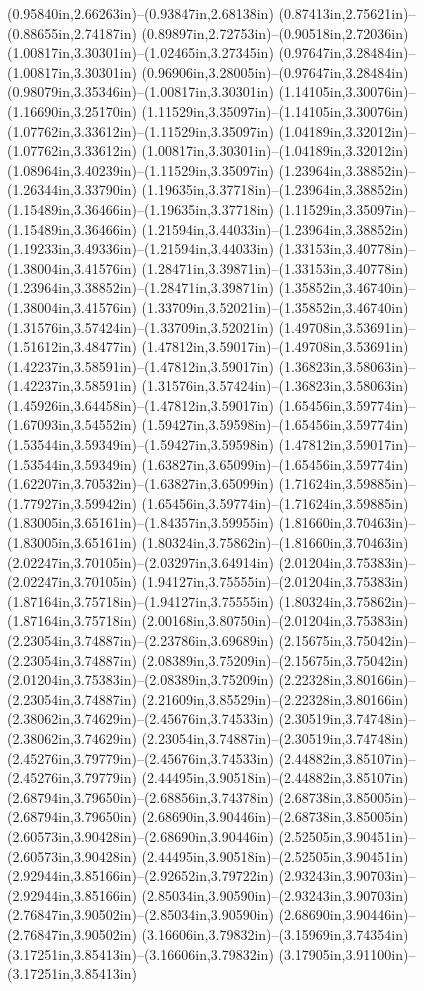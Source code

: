 (0.95840in,2.66263in)--(0.93847in,2.68138in) (0.87413in,2.75621in)--(0.88655in,2.74187in) (0.89897in,2.72753in)--(0.90518in,2.72036in) (1.00817in,3.30301in)--(1.02465in,3.27345in) (0.97647in,3.28484in)--(1.00817in,3.30301in) (0.96906in,3.28005in)--(0.97647in,3.28484in) (0.98079in,3.35346in)--(1.00817in,3.30301in) (1.14105in,3.30076in)--(1.16690in,3.25170in) (1.11529in,3.35097in)--(1.14105in,3.30076in) (1.07762in,3.33612in)--(1.11529in,3.35097in) (1.04189in,3.32012in)--(1.07762in,3.33612in) (1.00817in,3.30301in)--(1.04189in,3.32012in) (1.08964in,3.40239in)--(1.11529in,3.35097in) (1.23964in,3.38852in)--(1.26344in,3.33790in) (1.19635in,3.37718in)--(1.23964in,3.38852in) (1.15489in,3.36466in)--(1.19635in,3.37718in) (1.11529in,3.35097in)--(1.15489in,3.36466in) (1.21594in,3.44033in)--(1.23964in,3.38852in) (1.19233in,3.49336in)--(1.21594in,3.44033in) (1.33153in,3.40778in)--(1.38004in,3.41576in) (1.28471in,3.39871in)--(1.33153in,3.40778in) (1.23964in,3.38852in)--(1.28471in,3.39871in) (1.35852in,3.46740in)--(1.38004in,3.41576in) (1.33709in,3.52021in)--(1.35852in,3.46740in) (1.31576in,3.57424in)--(1.33709in,3.52021in) (1.49708in,3.53691in)--(1.51612in,3.48477in) (1.47812in,3.59017in)--(1.49708in,3.53691in) (1.42237in,3.58591in)--(1.47812in,3.59017in) (1.36823in,3.58063in)--(1.42237in,3.58591in) (1.31576in,3.57424in)--(1.36823in,3.58063in) (1.45926in,3.64458in)--(1.47812in,3.59017in) (1.65456in,3.59774in)--(1.67093in,3.54552in) (1.59427in,3.59598in)--(1.65456in,3.59774in) (1.53544in,3.59349in)--(1.59427in,3.59598in) (1.47812in,3.59017in)--(1.53544in,3.59349in) (1.63827in,3.65099in)--(1.65456in,3.59774in) (1.62207in,3.70532in)--(1.63827in,3.65099in) (1.71624in,3.59885in)--(1.77927in,3.59942in) (1.65456in,3.59774in)--(1.71624in,3.59885in) (1.83005in,3.65161in)--(1.84357in,3.59955in) (1.81660in,3.70463in)--(1.83005in,3.65161in) (1.80324in,3.75862in)--(1.81660in,3.70463in) (2.02247in,3.70105in)--(2.03297in,3.64914in) (2.01204in,3.75383in)--(2.02247in,3.70105in) (1.94127in,3.75555in)--(2.01204in,3.75383in) (1.87164in,3.75718in)--(1.94127in,3.75555in) (1.80324in,3.75862in)--(1.87164in,3.75718in) (2.00168in,3.80750in)--(2.01204in,3.75383in) (2.23054in,3.74887in)--(2.23786in,3.69689in) (2.15675in,3.75042in)--(2.23054in,3.74887in) (2.08389in,3.75209in)--(2.15675in,3.75042in) (2.01204in,3.75383in)--(2.08389in,3.75209in) (2.22328in,3.80166in)--(2.23054in,3.74887in) (2.21609in,3.85529in)--(2.22328in,3.80166in) (2.38062in,3.74629in)--(2.45676in,3.74533in) (2.30519in,3.74748in)--(2.38062in,3.74629in) (2.23054in,3.74887in)--(2.30519in,3.74748in) (2.45276in,3.79779in)--(2.45676in,3.74533in) (2.44882in,3.85107in)--(2.45276in,3.79779in) (2.44495in,3.90518in)--(2.44882in,3.85107in) (2.68794in,3.79650in)--(2.68856in,3.74378in) (2.68738in,3.85005in)--(2.68794in,3.79650in) (2.68690in,3.90446in)--(2.68738in,3.85005in) (2.60573in,3.90428in)--(2.68690in,3.90446in) (2.52505in,3.90451in)--(2.60573in,3.90428in) (2.44495in,3.90518in)--(2.52505in,3.90451in) (2.92944in,3.85166in)--(2.92652in,3.79722in) (2.93243in,3.90703in)--(2.92944in,3.85166in) (2.85034in,3.90590in)--(2.93243in,3.90703in) (2.76847in,3.90502in)--(2.85034in,3.90590in) (2.68690in,3.90446in)--(2.76847in,3.90502in) (3.16606in,3.79832in)--(3.15969in,3.74354in) (3.17251in,3.85413in)--(3.16606in,3.79832in) (3.17905in,3.91100in)--(3.17251in,3.85413in) 
